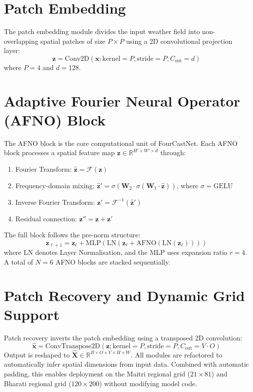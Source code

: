 \documentclass[12pt,titlepage,a4paper]{report}
\begin{document}
\section{Patch Embedding}
The patch embedding module divides the input weather field into non-overlapping spatial patches of size $P \times P$ using a 2D convolutional projection layer:
\begin{equation}
    \mathbf{z} = \text{Conv2D}(\mathbf{x}; \text{kernel}=P, \text{stride}=P, C_{\text{out}}=d)
\end{equation}
where $P=4$ and $d=128$.

\section{Adaptive Fourier Neural Operator (AFNO) Block}
The AFNO block is the core computational unit of FourCastNet. Each AFNO block processes a spatial feature map $\mathbf{z} \in \mathbb{R}^{H' \times W' \times d}$ through:
\begin{enumerate}
    \item Fourier Transform: $\hat{\mathbf{z}} = \mathcal{F}(\mathbf{z})$
    \item Frequency-domain mixing: $\hat{\mathbf{z}}' = \sigma(\mathbf{W}_2 \cdot \sigma(\mathbf{W}_1 \cdot \hat{\mathbf{z}}))$, where $\sigma = \text{GELU}$
    \item Inverse Fourier Transform: $\mathbf{z}' = \mathcal{F}^{-1}(\hat{\mathbf{z}}')$
    \item Residual connection: $\mathbf{z}'' = \mathbf{z} + \mathbf{z}'$
\end{enumerate}
The full block follows the pre-norm structure:
\begin{equation}
    \mathbf{z}_{\ell+1} = \mathbf{z}_\ell + \text{MLP}(\text{LN}(\mathbf{z}_\ell + \text{AFNO}(\text{LN}(\mathbf{z}_\ell))))
\end{equation}
where $\text{LN}$ denotes Layer Normalisation, and the MLP uses expansion ratio $r=4$. A total of $N=6$ AFNO blocks are stacked sequentially.

\section{Patch Recovery and Dynamic Grid Support}
Patch recovery inverts the patch embedding using a transposed 2D convolution:
\begin{equation}
    \hat{\mathbf{x}} = \text{ConvTranspose2D}(\mathbf{z}; \text{kernel}=P, \text{stride}=P, C_{\text{out}}=V \cdot O)
\end{equation}
Output is reshaped to $\hat{\mathbf{X}} \in \mathbb{R}^{B \times O \times V \times H \times W}$. All modules are refactored to automatically infer spatial dimensions from input data. Combined with automatic padding, this enables deployment on the Maitri regional grid ($21 \times 81$) and Bharati regional grid ($120 \times 200$) without modifying model code.
\end{document}
